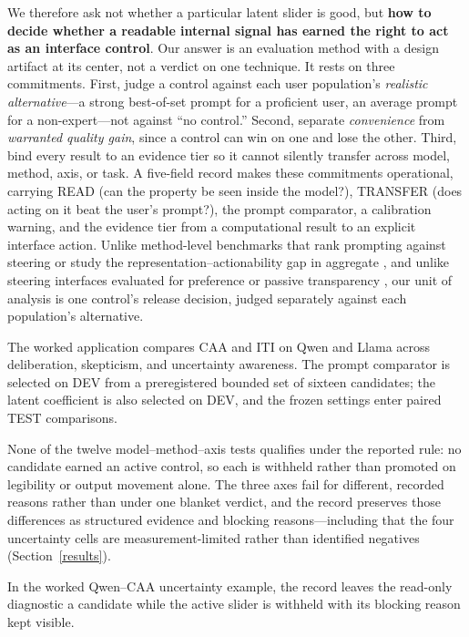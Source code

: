 \documentclass[manuscript,review,anonymous]{acmart}
\begin{document}
We therefore ask not whether a particular latent slider is good, but \textbf{how to decide whether a readable internal signal has earned the right to act as an interface control}. Our answer is an evaluation method with a design artifact at its center, not a verdict on one technique. It rests on three commitments. First, judge a control against each user population's \emph{realistic alternative}---a strong best-of-set prompt for a proficient user, an average prompt for a non-expert---not against ``no control.'' Second, separate \emph{convenience} from \emph{warranted quality gain}, since a control can win on one and lose the other. Third, bind every result to an evidence tier so it cannot silently transfer across model, method, axis, or task. A five-field record makes these commitments operational, carrying READ (can the property be seen inside the model?), TRANSFER (does acting on it beat the user's prompt?), the prompt comparator, a calibration warning, and the evidence tier from a computational result to an explicit interface action. Unlike method-level benchmarks that rank prompting against steering \cite{wu2025axbench} or study the representation--actionability gap in aggregate \cite{basu2026actionability}, and unlike steering interfaces evaluated for preference \cite{bo2026steerable} or passive transparency \cite{karny2026neural}, our unit of analysis is one control's release decision, judged separately against each population's alternative. {}%
{}%
{}%

The worked application compares CAA and ITI on Qwen and Llama across deliberation, skepticism, and uncertainty awareness. The prompt comparator is selected on DEV from a preregistered bounded set of sixteen candidates; the latent coefficient is also selected on DEV, and the frozen settings enter paired TEST comparisons. {}%
{}%
{}%

None of the twelve model--method--axis tests qualifies under the reported rule: no candidate earned an active control, so each is withheld rather than promoted on legibility or output movement alone. The three axes fail for different, recorded reasons rather than under one blanket verdict, and the record preserves those differences as structured evidence and blocking reasons---including that the four uncertainty cells are measurement-limited rather than identified negatives (Section~\ref{results}). {}%

In the worked Qwen--CAA uncertainty example, the record leaves the read-only diagnostic a candidate while the active slider is withheld with its blocking reason kept visible. {}%
\end{document}
